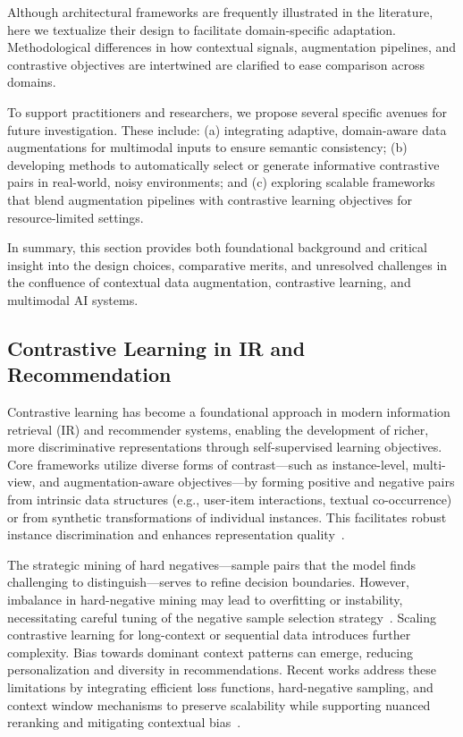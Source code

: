 \documentclass[sigconf]{acmart}
\begin{document}
Although architectural frameworks are frequently illustrated in the literature, here we textualize their design to facilitate domain-specific adaptation. Methodological differences in how contextual signals, augmentation pipelines, and contrastive objectives are intertwined are clarified to ease comparison across domains.

To support practitioners and researchers, we propose several specific avenues for future investigation. These include: (a) integrating adaptive, domain-aware data augmentations for multimodal inputs to ensure semantic consistency; (b) developing methods to automatically select or generate informative contrastive pairs in real-world, noisy environments; and (c) exploring scalable frameworks that blend augmentation pipelines with contrastive learning objectives for resource-limited settings.

In summary, this section provides both foundational background and critical insight into the design choices, comparative merits, and unresolved challenges in the confluence of contextual data augmentation, contrastive learning, and multimodal AI systems.

\subsection{Contrastive Learning in IR and Recommendation}

Contrastive learning has become a foundational approach in modern information retrieval (IR) and recommender systems, enabling the development of richer, more discriminative representations through self-supervised learning objectives. Core frameworks utilize diverse forms of contrast—such as instance-level, multi-view, and augmentation-aware objectives—by forming positive and negative pairs from intrinsic data structures (e.g., user-item interactions, textual co-occurrence) or from synthetic transformations of individual instances. This facilitates robust instance discrimination and enhances representation quality~\cite{ref12,ref14,ref15,ref16,ref18,ref19,ref20,ref21,ref23,ref24,ref25,ref26,ref27,ref30,ref32,ref33,ref36,ref37,ref38,ref43,ref45,ref54,ref55,ref62}. 

The strategic mining of hard negatives—sample pairs that the model finds challenging to distinguish—serves to refine decision boundaries. However, imbalance in hard-negative mining may lead to overfitting or instability, necessitating careful tuning of the negative sample selection strategy~\cite{ref14,ref16,ref37}. Scaling contrastive learning for long-context or sequential data introduces further complexity. Bias towards dominant context patterns can emerge, reducing personalization and diversity in recommendations. Recent works address these limitations by integrating efficient loss functions, hard-negative sampling, and context window mechanisms to preserve scalability while supporting nuanced reranking and mitigating contextual bias~\cite{ref14,ref15,ref16,ref32,ref33,ref36,ref37,ref43,ref54,ref55}.
\end{document}
